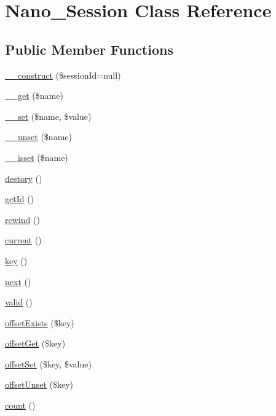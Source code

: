 \hypertarget{classNano__Session}{
\section{Nano\_\-Session Class Reference}
\label{classNano__Session}
}
\subsection*{Public Member Functions}
\begin{CompactItemize}
\item 
\hyperlink{classNano__Session_6afd4ba7d8417c936bbb8be40e51cd91}{\_\-\_\-construct} (\$sessionId=null)
\item 
\hyperlink{classNano__Session_8c06d63a2eb1a50715cde24f533d08e1}{\_\-\_\-get} (\$name)
\item 
\hyperlink{classNano__Session_90a7b2e05d567652db6bfec471f6a4bf}{\_\-\_\-set} (\$name, \$value)
\item 
\hyperlink{classNano__Session_cad4d5a9822e5ee2e0f36a1c2022b059}{\_\-\_\-unset} (\$name)
\item 
\hyperlink{classNano__Session_a8cfa3bfb6a0885a184ca97a5d4786bf}{\_\-\_\-isset} (\$name)
\item 
\hyperlink{classNano__Session_3f4e0cfc2842e11253b234ae1b2a408d}{destory} ()
\item 
\hyperlink{classNano__Session_14db04373e7fed431bf3f8edda12f901}{getId} ()
\item 
\hyperlink{classNano__Session_e904ede4af552be1515246169b33792a}{rewind} ()
\item 
\hyperlink{classNano__Session_efbd95d2dadc4c2a0eb359b3a99aae3d}{current} ()
\item 
\hyperlink{classNano__Session_795c19dceb4a315f4c080308c8a2b9e1}{key} ()
\item 
\hyperlink{classNano__Session_2e2bfede50b79f0f07a1cb3902f19bc6}{next} ()
\item 
\hyperlink{classNano__Session_bab2a2a0bb38e5dcee1e4ac2a6456d24}{valid} ()
\item 
\hyperlink{classNano__Session_3dc380b6f608b1034c37f66c92981fe2}{offsetExists} (\$key)
\item 
\hyperlink{classNano__Session_83a62bc7ea13ea1b099a1a574f82a6ef}{offsetGet} (\$key)
\item 
\hyperlink{classNano__Session_27a6c0d7c9d5d889710d5199764c53fc}{offsetSet} (\$key, \$value)
\item 
\hyperlink{classNano__Session_161d591f72fa5a75b18a66316fb23265}{offsetUnset} (\$key)
\item 
\hyperlink{classNano__Session_64fb8369d4cc1018da3b073f7368503e}{count} ()
\end{CompactItemize}

